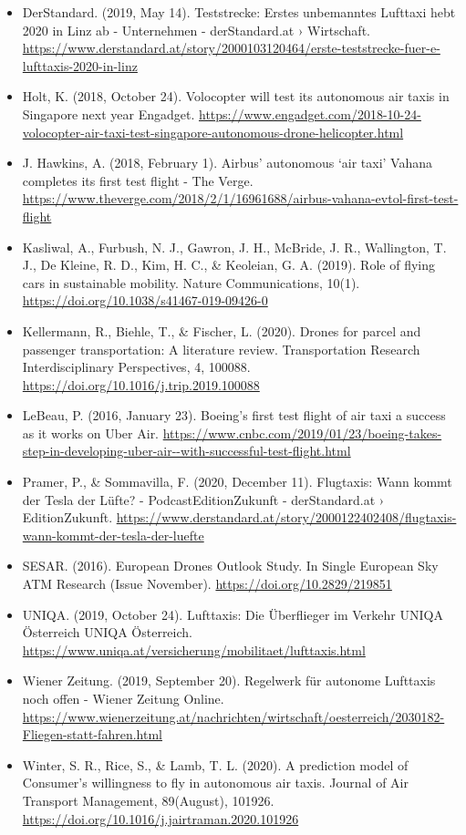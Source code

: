 \documentclass[
]{book}
\providecommand{\tightlist}{%
  \setlength{\itemsep}{0pt}\setlength{\parskip}{0pt}}
\begin{document}
\begin{itemize}
\tightlist
\item
  DerStandard. (2019, May 14). Teststrecke: Erstes unbemanntes Lufttaxi hebt 2020 in Linz ab - Unternehmen - derStandard.at › Wirtschaft. \url{https://www.derstandard.at/story/2000103120464/erste-teststrecke-fuer-e-lufttaxis-2020-in-linz}
\item
  Holt, K. (2018, October 24). Volocopter will test its autonomous air taxis in Singapore next year \textbar{} Engadget. \url{https://www.engadget.com/2018-10-24-volocopter-air-taxi-test-singapore-autonomous-drone-helicopter.html}
\item
  J. Hawkins, A. (2018, February 1). Airbus' autonomous `air taxi' Vahana completes its first test flight - The Verge. \url{https://www.theverge.com/2018/2/1/16961688/airbus-vahana-evtol-first-test-flight}
\item
  Kasliwal, A., Furbush, N. J., Gawron, J. H., McBride, J. R., Wallington, T. J., De Kleine, R. D., Kim, H. C., \& Keoleian, G. A. (2019). Role of flying cars in sustainable mobility. Nature Communications, 10(1). \url{https://doi.org/10.1038/s41467-019-09426-0}
\item
  Kellermann, R., Biehle, T., \& Fischer, L. (2020). Drones for parcel and passenger transportation: A literature review. Transportation Research Interdisciplinary Perspectives, 4, 100088. \url{https://doi.org/10.1016/j.trip.2019.100088}
\item
  LeBeau, P. (2016, January 23). Boeing's first test flight of air taxi a success as it works on Uber Air. \url{https://www.cnbc.com/2019/01/23/boeing-takes-step-in-developing-uber-air--with-successful-test-flight.html}
\item
  Pramer, P., \& Sommavilla, F. (2020, December 11). Flugtaxis: Wann kommt der Tesla der Lüfte? - PodcastEditionZukunft - derStandard.at › EditionZukunft. \url{https://www.derstandard.at/story/2000122402408/flugtaxis-wann-kommt-der-tesla-der-luefte}
\item
  SESAR. (2016). European Drones Outlook Study. In Single European Sky ATM Research (Issue November). \url{https://doi.org/10.2829/219851}
\item
  UNIQA. (2019, October 24). Lufttaxis: Die Überflieger im Verkehr \textbar{} UNIQA Österreich \textbar{} UNIQA Österreich. \url{https://www.uniqa.at/versicherung/mobilitaet/lufttaxis.html}
\item
  Wiener Zeitung. (2019, September 20). Regelwerk für autonome Lufttaxis noch offen - Wiener Zeitung Online. \url{https://www.wienerzeitung.at/nachrichten/wirtschaft/oesterreich/2030182-Fliegen-statt-fahren.html}
\item
  Winter, S. R., Rice, S., \& Lamb, T. L. (2020). A prediction model of Consumer's willingness to fly in autonomous air taxis. Journal of Air Transport Management, 89(August), 101926. \url{https://doi.org/10.1016/j.jairtraman.2020.101926}
\end{itemize}
\end{document}

